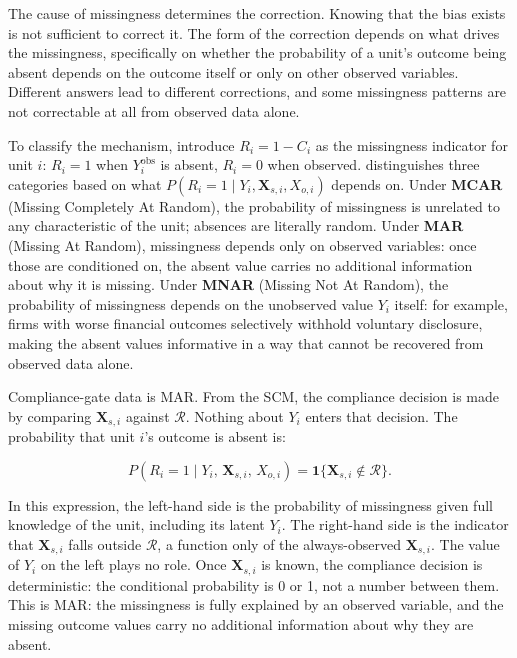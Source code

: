 The cause of missingness determines the correction. Knowing that the bias exists is not sufficient to correct it. The form of the correction depends on what drives the missingness, specifically on whether the probability of a unit's outcome being absent depends on the outcome itself or only on other observed variables. Different answers lead to different corrections, and some missingness patterns are not correctable at all from observed data alone.

To classify the mechanism, introduce $R_i = 1 - C_i$ as the missingness indicator for unit $i$: $R_i = 1$ when $Y_i^{\text{obs}}$ is absent, $R_i = 0$ when observed.  distinguishes three categories based on what $P(R_i = 1 \mid Y_i, \mathbf{X}_{s,i}, X_{o,i})$ depends on. Under \textbf{MCAR} (Missing Completely At Random), the probability of missingness is unrelated to any characteristic of the unit; absences are literally random. Under \textbf{MAR} (Missing At Random), missingness depends only on observed variables: once those are conditioned on, the absent value carries no additional information about why it is missing. Under \textbf{MNAR} (Missing Not At Random), the probability of missingness depends on the unobserved value $Y_i$ itself: for example, firms with worse financial outcomes selectively withhold voluntary disclosure, making the absent values informative in a way that cannot be recovered from observed data alone.

Compliance-gate data is MAR. From the SCM, the compliance decision is made by comparing $\mathbf{X}_{s,i}$ against $\mathcal{R}$. Nothing about $Y_i$ enters that decision. The probability that unit $i$'s outcome is absent is:

\[
P(R_i = 1 \mid Y_i,\, \mathbf{X}_{s,i},\, X_{o,i}) = \mathbf{1}\{\mathbf{X}_{s,i} \notin \mathcal{R}\}.
\]

In this expression, the left-hand side is the probability of missingness given full knowledge of the unit, including its latent $Y_i$. The right-hand side is the indicator that $\mathbf{X}_{s,i}$ falls outside $\mathcal{R}$, a function only of the always-observed $\mathbf{X}_{s,i}$. The value of $Y_i$ on the left plays no role. Once $\mathbf{X}_{s,i}$ is known, the compliance decision is deterministic: the conditional probability is 0 or 1, not a number between them. This is MAR: the missingness is fully explained by an observed variable, and the missing outcome values carry no additional information about why they are absent.

